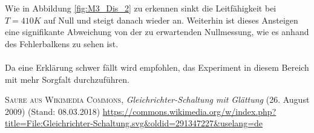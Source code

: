 Wie in Abbildung \ref{fig:M3_Dis_2} zu erkennen sinkt die Leitfähigkeit bei $T=410K$ auf Null und steigt danach wieder an. Weiterhin ist dieses Ansteigen eine signifikante Abweichung von der zu erwartenden Nullmessung, wie es anhand des Fehlerbalkens zu sehen ist.\\
\\
Da eine Erklärung schwer fällt wird empfohlen, das Experiment in diesem Bereich mit mehr Sorgfalt durchzuführen.\\

\listoffigures
\listoftables
\begin{thebibliography}{99}
	 \textsc{Saure aus Wikimedia Commons}, \emph{Gleichrichter-Schaltung mit Glättung} (26. August 2009) (Stand: 08.03.2018) \url{https://commons.wikimedia.org/w/index.php?title=File:Gleichrichter-Schaltung.svg&oldid=291347227&uselang=de}
\end{thebibliography}
